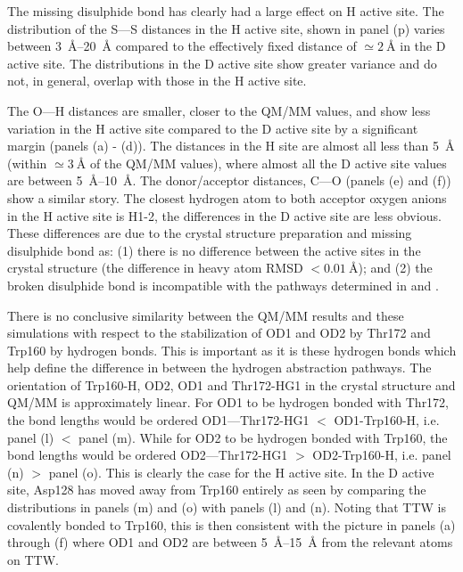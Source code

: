 The missing disulphide bond has clearly had a large effect on H active site.  The distribution of the S---S distances in the H active site, shown in panel (p) varies between  \SIrange{3}{20}{\angstrom} compared to the effectively fixed distance of $\simeq \SI{2}{\angstrom}$ in the D active site. The distributions in the D active site show greater variance and do not, in general, overlap with those in the H active site.

The O---H distances are smaller, closer to the QM/MM values, and show less variation in the H active site compared to the D active site by a significant margin (panels (a) - (d)). The distances in the H site are almost all less than \SI{5}{\angstrom} (within $\simeq\SI{3}{\angstrom}$ of the QM/MM values), where almost all the D active site values are between \SIrange{5}{10}{\angstrom}. The donor/acceptor distances, C---O (panels (e) and (f)) show a similar story. The closest hydrogen atom to both acceptor oxygen anions in the H active site is H1-2, the differences in the D active site are less obvious. These differences are due to the crystal structure preparation and missing disulphide bond as: (1) there is no difference between the active sites in the crystal structure (the difference in heavy atom RMSD  $<\SI{0.01}{\angstrom}$); and (2) the broken disulphide bond is incompatible with the pathways determined in \cite{masgrauTunnelingClassicalPaths2007}
and \cite{ranaghanInitioQMMM2017}. 

There is no conclusive similarity between the QM/MM results and these simulations with respect to the stabilization of OD1 and OD2 by Thr172 and Trp160 by hydrogen bonds. This is important as it is these hydrogen bonds which help define the difference in between the hydrogen abstraction pathways. The orientation of Trp160-H, OD2, OD1 and Thr172-HG1 in the crystal structure and QM/MM is approximately linear. For OD1 to be hydrogen bonded with Thr172, the bond lengths would be ordered OD1---Thr172-HG1 $<$ OD1-Trp160-H, i.e. panel (l) $<$ panel (m). While for OD2 to be hydrogen bonded with Trp160, the bond lengths would be ordered OD2---Thr172-HG1 $>$ OD2-Trp160-H, i.e. panel (n) $>$ panel (o). This is clearly the case for the H active site. In the D active site, Asp128 has moved away from Trp160 entirely as seen by comparing the distributions in  panels (m) and (o)  with panels (l) and (n). Noting that TTW is covalently bonded to Trp160, this is then consistent with the picture in panels (a) through (f) where OD1 and OD2 are between \SIrange{5}{15}{\angstrom} from the relevant atoms on TTW.  

